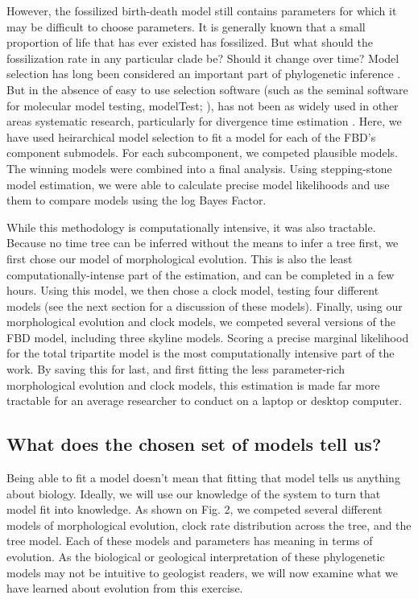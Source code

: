 \documentclass{article}
\begin{document}
However, the fossilized birth-death model still contains parameters for which it may be difficult to choose parameters.
It is generally known that a small proportion of life that has ever existed has fossilized. 
But what should the fossilization rate in any particular clade be?
Should it change over time? 
Model selection has long been considered an important part of phylogenetic inference \citep{Zwickl2004, allman08b, Baele2013a}.
But in the absence of easy to use selection software (such as the seminal software for molecular model testing, modelTest; \cite{posada1998}), has not been as widely used in other areas systematic research, particularly for divergence time estimation \citep{Duchene2015}.
Here, we have used heirarchical model selection to fit a model for each of the FBD's component submodels.
For each subcomponent, we competed plausible models.
The winning models were combined into a final analysis.
Using stepping-stone model estimation, we were able to calculate precise model likelihoods and use them to compare models using the log Bayes Factor.

While this methodology is computationally intensive, it was also tractable. 
Because no time tree can be inferred without the means to infer a tree first, we first chose our model of morphological evolution.
This is also the least computationally-intense part of the estimation, and can be completed in a few hours.
Using this model, we then chose a clock model, testing four different models (see the next section for a discussion of these models).
Finally, using our morphological evolution and clock models, we competed several versions of the FBD model, including three skyline models.
Scoring a precise marginal likelihood for the total tripartite model is the most computationally intensive part of the work. 
By saving this for last, and first fitting the less parameter-rich morphological evolution and clock models, this estimation is made far more tractable for an average researcher to conduct on a laptop or desktop computer. 



\subsection{What does the chosen set of models tell us?}

Being able to fit a model doesn't mean that fitting that model tells us anything about biology. 
Ideally, we will use our knowledge of the system to turn that model fit into knowledge. 
As shown on Fig. 2, we competed several different models of morphological evolution, clock rate distribution across the tree, and the tree model. 
Each of these models and parameters has meaning in terms of evolution. 
As the biological or geological interpretation of these phylogenetic models may not be intuitive to geologist readers, we will now examine what we have learned about evolution from this exercise.
\end{document}
